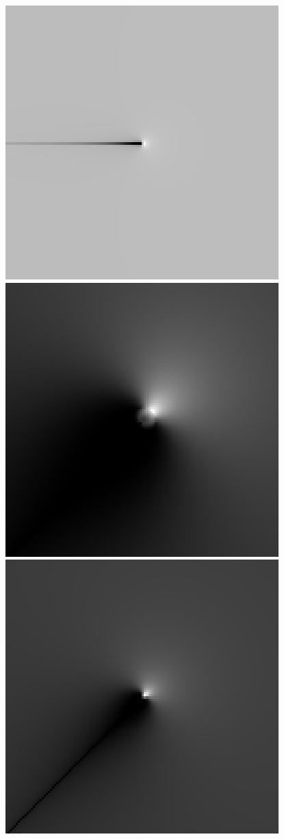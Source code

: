 \begin{figure}
{ }
 \subbottom
 {
 \includegraphics[scale=1]{figures/dfilt_wr_sqrt200.png}
 }
 \subbottom
 {
 \includegraphics[scale=1]{figures/dfilt_wur_sqrt2.png}
 }
 \subbottom
 {
 \includegraphics[scale=1]{figures/dfilt_wur_sqrt8.png}
}
\end{figure}

